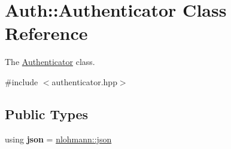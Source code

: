 \hypertarget{classAuth_1_1Authenticator}{}\section{Auth\+:\+:Authenticator Class Reference}
\label{classAuth_1_1Authenticator}


The \hyperlink{classAuth_1_1Authenticator}{Authenticator} class.  




{\ttfamily \#include $<$authenticator.\+hpp$>$}

\subsection*{Public Types}
\begin{DoxyCompactItemize}
\item 
\mbox{\label{classAuth_1_1Authenticator_aa2af15fcb130ee423175aa5452e3d8be}} 
using {\bfseries json} = \hyperlink{namespacenlohmann_a2bfd99e845a2e5cd90aeaf1b1431f474}{nlohmann\+::json}
\end{DoxyCompactItemize}
